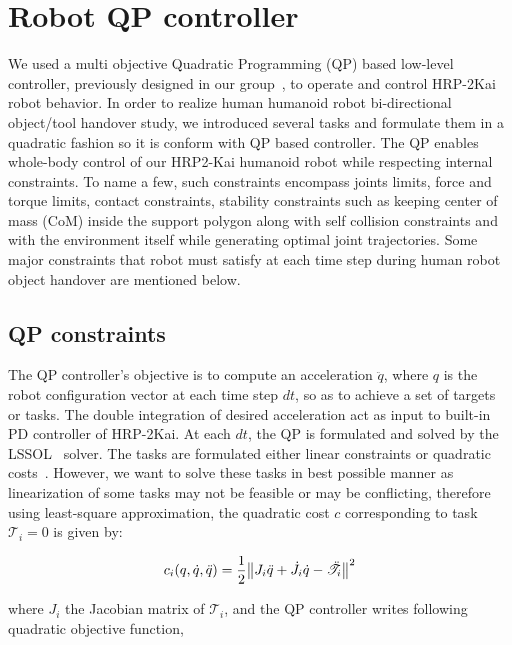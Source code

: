 \clearpage

\section{Robot QP controller}\label{QPController}

We used a multi objective Quadratic Programming (QP) based low-level controller, previously designed in our group~\cite{ladder-HRP-2Kai}, to operate and control HRP-2Kai robot behavior. In order to realize human humanoid robot bi-directional object/tool handover study, we introduced several tasks and formulate them in a quadratic fashion so it is conform with QP based controller. The QP enables whole-body control of our HRP2-Kai humanoid robot while respecting internal constraints. To name a few, such constraints encompass joints limits, force and torque limits, contact constraints, stability constraints such as keeping center of mass (CoM) inside the support polygon along with self collision constraints and with the environment itself while generating optimal joint trajectories. Some major constraints that robot must satisfy at each time step during human robot object handover are mentioned below.


\subsection{QP constraints}\label{QPConstraints}
The QP controller's objective is to compute an acceleration $\ddot{q}$, where $q$ is the robot configuration vector at each time step $dt$, so as to achieve a set of targets or tasks. The double integration of desired acceleration act as input to built-in PD controller of HRP-2Kai. At each $dt$, the QP is formulated and solved by the LSSOL~\cite{gill1986fortran} solver. The tasks are formulated either linear constraints or quadratic costs~\cite{ladder-HRP-2Kai, pfeiffer2017nut}. However, we want to solve these tasks in best possible manner as linearization of some tasks may not be feasible or may be conflicting, therefore using least-square approximation, the quadratic cost $c$ corresponding to task $\mathscr{T}_i =0$ is given by:

\begin{equation}
c_i(q,\dot{q}, \ddot{q})  = \frac{1}{2}{\norm{ J_i\ddot{q} + \dot{J}_i\dot{q} -\ddot{\mathscr{T}}_i }^2 }
\end{equation}

where $J_i$ the Jacobian matrix of $\mathscr{T}_i$, and the QP controller writes following quadratic objective function,

